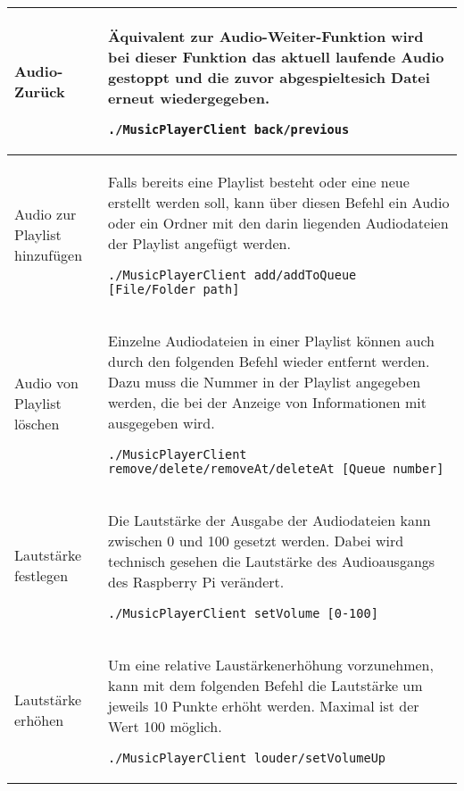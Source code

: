 \begin{longtable}{l|l}
Audio-Zurück & \begin{minipage}[t]{.558\textwidth} Äquivalent zur Audio-Weiter-Funktion wird bei dieser Funktion das aktuell laufende Audio gestoppt und die zuvor abgespieltesich Datei erneut wiedergegeben.  \begin{lstlisting}
./MusicPlayerClient back/previous
\end{lstlisting} \end{minipage} \\ \hline

Audio zur Playlist hinzufügen &  \begin{minipage}[t]{.558\textwidth} Falls bereits eine Playlist besteht oder eine neue erstellt werden soll, kann über diesen Befehl ein Audio oder ein Ordner mit den darin liegenden Audiodateien der Playlist angefügt werden. \begin{lstlisting}
./MusicPlayerClient add/addToQueue [File/Folder path]
\end{lstlisting} \end{minipage} \\ \hline

Audio von Playlist löschen & \begin{minipage}[t]{.558\textwidth} Einzelne Audiodateien in einer Playlist können auch durch den folgenden Befehl wieder entfernt werden. Dazu muss die Nummer in der Playlist angegeben werden, die bei der Anzeige von Informationen mit ausgegeben wird. \begin{lstlisting}
./MusicPlayerClient remove/delete/removeAt/deleteAt [Queue number]
\end{lstlisting} \end{minipage} \\ \hline

Lautstärke festlegen & \begin{minipage}[t]{.558\textwidth} Die Lautstärke der Ausgabe der Audiodateien kann zwischen 0 und 100 gesetzt werden. Dabei wird technisch gesehen die Lautstärke des Audioausgangs des Raspberry Pi verändert. \begin{lstlisting}
./MusicPlayerClient setVolume [0-100]
\end{lstlisting} \end{minipage} \\ \hline

Lautstärke erhöhen & \begin{minipage}[t]{.558\textwidth} 
Um eine relative Laustärkenerhöhung vorzunehmen, kann mit dem folgenden Befehl die Lautstärke um jeweils 10 Punkte erhöht werden. Maximal ist der Wert 100 möglich. \begin{lstlisting}
./MusicPlayerClient louder/setVolumeUp
\end{lstlisting} \end{minipage} \\ \hline


\end{longtable}
